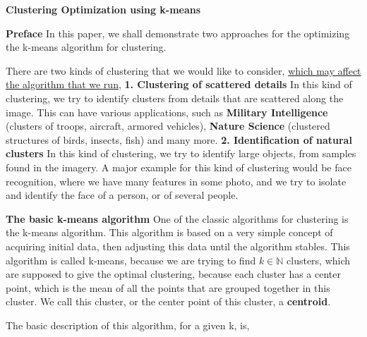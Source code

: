 \documentclass[12pt]{article}
\begin{document}
\textbf{Clustering Optimization using k-means}

\textbf{Preface}
In this paper, we shall demonstrate two approaches for the optimizing the k-means algorithm for clustering. \newline

There are two kinds of clustering that we would like to consider, \newline
\underline{which may affect the algorithm that we run}, \newline \newline
\textbf{1. Clustering of scattered details} \newline
In this kind of clustering, we try to identify clusters from details that are scattered along the image.
This can have various applications, such as \newline \textbf{Military Intelligence} (clusters of troops, aircraft, armored vehicles), \newline
\textbf{Nature Science} (clustered structures of birds, insects, fish) and many more. \newline \newline
\textbf{2. Identification of natural clusters} \newline
In this kind of clustering, we try to identify large objects, from samples found in the imagery. A major example for this
kind of clustering would be face recognition, where we have many features in some photo, and we try to isolate and
identify the face of a person, or of several people. \newline

\textbf{The basic k-means algorithm}
One of the classic algorithms for clustering is the k-means algorithm. This algorithm is based on a very simple concept
of acquiring initial data, then adjusting this data until the algorithm stables. \newline
This algorithm is called k-means, because we are trying to find \( k \in \mathbb{N} \) clusters, which are supposed to
give the optimal clustering, because each cluster has a center point, which is the mean of all the points that are grouped
together in this cluster. We call this cluster, or the center point of this cluster, a \textbf{centroid}. \newline

The basic description of this algorithm, for a given k, is,
\end{document}
